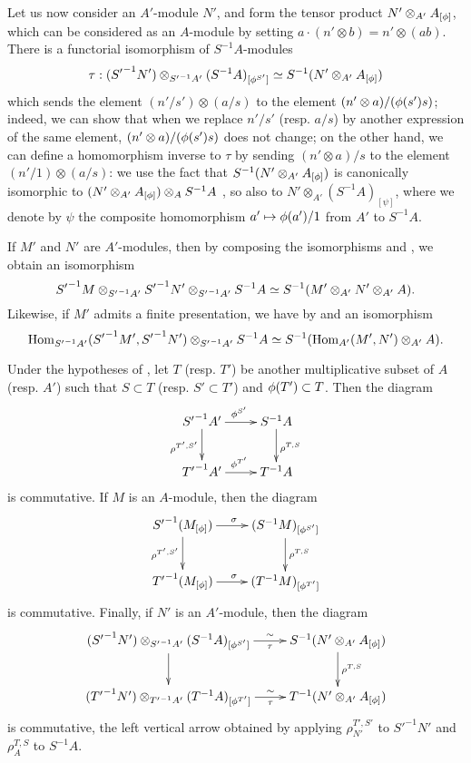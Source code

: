 \begin{env}[1.5.4]
\label{0.1.5.4}
Let us now consider an $A'$-module $N'$, and form the tensor product
$N'\otimes_{A'}A_{[\phi]}$, which can be considered as an $A$-module by setting
$a\cdot(n'\otimes b)=n'\otimes(ab)$.
There is a functorial isomorphism of $S^{-1}A$-modules
\[
  \tau:({S'}^{-1}N')\otimes_{{S'}^{-1}A'}(S^{-1}A)_{[\phi^{S'}]}\simeq S^{-1}(N'\otimes_{A'}A_{[\phi]})
\]
which
sends the element $(n'/s')\otimes(a/s)$ to the element
$(n'\otimes a)/(\phi(s')s)$; indeed, we can show that when we replace
$n'/s'$ (resp. $a/s$) by another expression of the same element,
$(n'\otimes a)/(\phi(s')s)$ does not change; on the other hand, we can define
a homomorphism inverse to $\tau$ by sending $(n'\otimes a)/s$ to the element
$(n'/1)\otimes(a/s)$: we use the fact that $S^{-1}(N'\otimes_{A'}A_{[\phi]})$
is canonically isomorphic to $(N'\otimes_{A'}A_{[\phi]})\otimes_A S^{-1}A$
, so also to $N'\otimes_{A'}(S^{-1}A)_{[\psi]}$, where we
denote by $\psi$ the composite homomorphism $a'\mapsto\vphi(a')/1$ from $A'$ to $S^{-1}A$.
\end{env}

\begin{env}[1.5.5]
\label{0.1.5.5}
If $M'$ and $N'$ are $A'$-modules, then by composing the isomorphisms  and , we obtain an isomorphism
\[
  {S'}^{-1}M\otimes_{{S'}^{-1}A'}{S'}^{-1}N'\otimes_{{S'}^{-1}A'}S^{-1}A\simeq S^{-1}(M'\otimes_{A'}N'\otimes_{A'}A).
\]
Likewise, if $M'$ admits a finite presentation, we have by  and  an isomorphism
\[
  {\mathop{\mathrm{Hom}}\nolimits}_{{S'}^{-1}A'}({S'}^{-1}M',{S'}^{-1}N')\otimes_{{S'}^{-1}A'}S^{-1}A\simeq S^{-1}({\mathop{\mathrm{Hom}}\nolimits}_{A'}(M',N')\otimes_{A'}A).
\]
\end{env}

\begin{env}[1.5.6]
\label{0.1.5.6}
Under the hypotheses of , let $T$ (resp. $T'$) be another multiplicative subset of $A$ (resp. $A'$) such that $S\subset T$ (resp. $S'\subset T'$) and $\phi(T')\subset T$.
Then the diagram
\[
  \xymatrix{
    {{S'}^{-1}A'}\ar[r]^{\vphi^{S'}}\ar[d]_{\rho^{T',S'}} &
    {S^{-1}A}\ar[d]^{\rho^{T,S}}\\
    {{T'}^{-1}A'}\ar[r]^{\vphi^{T'}} &
    {T^{-1}A}
  }
\]
is commutative.
If $M$ is an $A$-module, then the diagram
\[
  \xymatrix{
    {{S'}^{-1}(M_{[\vphi]})}\ar[r]^\sigma\ar[d]_{\rho^{T',S'}} &
    {(S^{-1}M)_{[\vphi^{S'}]}}\ar[d]^{\rho^{T,S}}\\
    {{T'}^{-1}(M_{[\vphi]})}\ar[r]^\sigma &
    {(T^{-1}M)_{[\vphi^{T'}]}}
  }
\]
is commutative.
Finally, if $N'$ is an $A'$-module, then the diagram
\[
  \xymatrix{
    ({S'}^{-1}N')\otimes_{{S'}^{-1}A'}(S^{-1}A)_{[\vphi^{S'}]}\ar[r]^-\sim_-\tau\ar[d] &
    S^{-1}(N'\otimes_{A'}A_{[\vphi]})\ar[d]^{\rho^{T,S}}\\
    ({T'}^{-1}N')\otimes_{{T'}^{-1}A'}(T^{-1}A)_{[\vphi^{T'}]}\ar[r]^-\sim_-\tau &
    T^{-1}(N'\otimes_{A'}A_{[\vphi]})
  }
\]
is commutative, the left vertical arrow obtained by applying $\rho_{N'}^{T',S'}$ to ${S'}^{-1}N'$ and $\rho_A^{T,S}$ to $S^{-1}A$.
\end{env}

